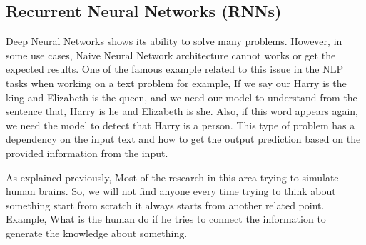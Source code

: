 \subsection{Recurrent Neural Networks (RNNs)}\label{Sec:RNN}

Deep Neural Networks shows its ability to solve many problems. However, in some use cases, Naive Neural Network architecture cannot works or get the expected results. One of the famous example related to this issue in the NLP tasks when working on a text problem for example, If we say our Harry is the king and Elizabeth is the queen, and we need our model to understand from the sentence that, Harry is he and Elizabeth is she. Also, if this word appears again, we need the model to detect that Harry is a person.
This type of problem has a dependency on the input text and how to get the output prediction based on the provided information from the input.

As explained previously, Most of the research in this area trying to simulate human brains. So, we will not find anyone every time trying to think about something start from scratch it always starts from another related point. Example, What is the human do if he tries to connect the information to generate the knowledge about something.

